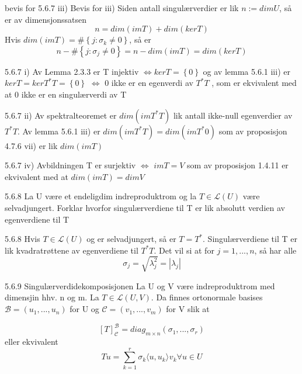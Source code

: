 \documentclass[a4paper,norsk]{article}
\begin{document}
\begin{proofbox}{bevis for 5.6.7 iii)}{}
Bevis for iii)
Siden antall singulærverdier er lik $ n := dimU $, så er av dimensjonssatsen
\[
    n = dim \left( imT \right) + dim \left( kerT \right) 
\]
Hvis $ dim \left( imT \right) = \# \left\{ j: \sigma_k \neq 0 \right\}  $, så er
\[
    n - \# \left\{ j: \sigma_j \neq 0 \right\} = n - dim \left( imT \right) = dim \left( ker T \right) 
\]
\end{proofbox}

\begin{proofbox}{5.6.7 i)}{}
Av Lemma 2.3.3 er T injektiv $ \iff  kerT = \left\{ 0 \right\} $ og av lemma 5.6.1 iii) er $ kerT = kerT^*T = \left\{ 0 \right\} $ $ \iff $ 0 ikke er en egenverdi av $ T^*T $ , som er ekvivalent med at 0 ikke er en singulærverdi av T
\end{proofbox}

\begin{proofbox}{5.6.7 ii)}{}
Av spektralteoremet er $ dim \left( imT^*T \right)  $ lik antall ikke-null egenverdier av $ T^*T $. Av lemma 5.6.1 iii) er $ dim \left( imT^*T \right) = dim \left( imT^*0 \right)  $ som av proposisjon 4.7.6 vii) er lik $ dim \left( imT \right)  $ 
\end{proofbox}

\begin{proofbox}{5.6.7 iv)}{}
Avbildningen T er surjektiv $ \iff $ $ imT = V $  som av proposisjon 1.4.11 er ekvivalent med at $ dim \left( imT \right) = dimV  $ 
\end{proofbox}

\begin{oppgavebox}{5.6.8}{}
La U være et endeligdim indreproduktrom og la $ T \in \mathcal{L}(U) $ være selvadjungert. Forklar hvorfor singulærverdiene til T er lik absolutt verdien av egenverdiene til T 

\begin{proofbox}{5.6.8}{}
Hvis $ T \in \mathcal{L}(U) $ og er selvadjungert, så er $ T= T^* $. Singulærverdiene til T er lik kvadratrøttene av egenverdiene til $ T^*T $. Det vil si at for $ j = 1, ..., n $, så har alle
\[
    \sigma_j = \sqrt{ \lambda _j^2 } = \left| \lambda_j \right| 
\]
\end{proofbox}
\end{oppgavebox}

\begin{theorembox}{5.6.9 Singulærverdidekomposisjonen}{}
La U og V være indreproduktrom med dimensjin hhv. n og m. La $ T \in \mathcal{L}(U, V) $. Da finnes ortonormale basises $ \mathcal{B} = \left( u_1, ..., u_n \right)  $ for U og $ \mathcal{C} = \left( v_1, ..., v_m \right)  $ for V slik at

\[
    \left[ T \right] _{\mathcal{C}}^{ \mathcal{B}} = diag_{m \times n} \left( \sigma_1, ..., \sigma_r \right) 
\]
eller ekvivalent
\[
    Tu = \sum_{ k=1 }^{ r } \sigma_k \langle u, u_k \rangle_{  } v_k \forall u \in U
\]
\end{theorembox}
\end{document}
